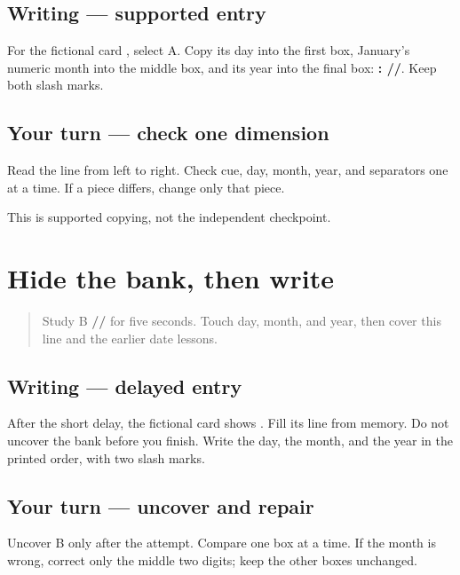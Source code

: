 \subsection*{Writing — supported entry}
For the fictional card \textbf{}, select A. Copy its day into the first box, January's numeric month into the middle box, and its year into the final box: \textbf{: //}. Keep both slash marks.

\subsection*{Your turn — check one dimension}
Read the line from left to right. Check cue, day, month, year, and separators one at a time. If a piece differs, change only that piece.

\begin{tcolorbox}[breakable,colback=teal!4,colframe=teal!35!black,title={Before you move on}]
This is supported copying, not the independent checkpoint.
\end{tcolorbox}
\section[\texorpdfstring{\pa{ਤਾਰੀਖ਼} (tārīkh)}{ਤਾਰੀਖ਼ (tārīkh)}]{Hide the bank, then write}

\label{lesson:PA-W09-date-delayed}



\begin{quote}
Study B \textbf{//} for five seconds. Touch day, month, and year, then cover this line and the earlier date lessons.
\end{quote}

\subsection*{Writing — delayed entry}
After the short delay, the fictional card shows \textbf{}. Fill its \textbf{} line from memory. Do not uncover the bank before you finish. Write the day, the month, and the year in the printed order, with two slash marks.

\subsection*{Your turn — uncover and repair}
Uncover B only after the attempt. Compare one box at a time. If the month is wrong, correct only the middle two digits; keep the other boxes unchanged.

